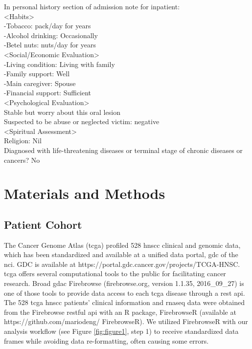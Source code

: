 \documentclass[jpm,article,submit,moreauthors,pdftex]{Definitions/mdpi}
\begin{document}
\begin{paracol}{2}
In personal history section of admission note for inpatient:\\
<Habits>\\
-Tobacco: \underline{ }\underline{ } pack/day for \underline{ }\underline{ } years\\
-Alcohol drinking: Occasionally\\
-Betel nuts: \underline{ }\underline{ } nuts/day for \underline{ }\underline{ } years\\
<Social/Economic Evaluation>\\
-Living condition: Living with family\\
-Family support: Well\\
-Main caregiver: Spouse\\
-Financial support: Sufficient\\
<Psychological Evaluation>\\
Stable but worry about this oral lesion\\
Suspected to be abuse or neglected victim: negative\\
<Spiritual Assessment>\\
Religion: Nil\\
Diagnosed with life-threatening diseases or terminal stage of chronic diseases or cancers? No


\section{Materials and Methods} %

\subsection{Patient Cohort} 

The Cancer Genome Atlas (\acrshort{tcga}) profiled 528 \acrshort{hnscc} clinical and genomic data, which has been standardized and available at a unified data portal, \acrfull{gdc} of the \acrfull{nci}.
GDC is available at https://portal.gdc.cancer.gov/projects/TCGA-HNSC.
\acrshort{tcga} offers several computational tools to the public for facilitating cancer research.
Broad \acrfull{gdac} Firebrowse (firebrowse.org, version 1.1.35, 2016\_09\_27) is one of those tools to provide data access to each \acrshort{tcga} disease through a \acrfull{rest} \acrfull{api}.
The 528 \acrshort{tcga} \acrshort{hnscc} patients' clinical information and \acrshort{rnaseq} data were obtained from the Firebrowse \acrshort{rest}ful \acrshort{api} with an R package, FirebrowseR (available at https://github.com/mariodeng/\linebreak
FirebrowseR)\cite{Deng2017}. 
We utilized FirebrowseR with our analysis workflow (see Figure \ref{fig:figure1}, step 1) to receive standardized data frames while avoiding data re-formatting, often causing some errors.


\end{paracol}
\end{document}
